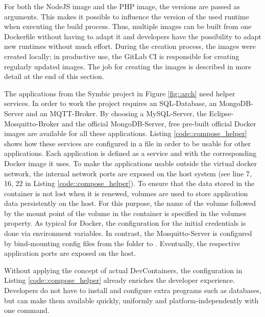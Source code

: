         
        For both the NodeJS image and the PHP image, the versions are passed as arguments. This makes it possible to influence the version of the used runtime when executing the build process. Thus, multiple images can be built from one Dockerfile without having to adapt it and developers have the possibility to adapt new runtimes without much effort. During the creation process, the images were created locally; in productive use, the GitLab \ac{CI} is responsible for creating regularly updated images. The job for creating the images is described in more detail at the end of this section.

        The applications from the Symbic project in Figure \ref{fig::arch} need helper services. In order to work the project requires an SQL-Database, an MongoDB-Server and an MQTT-Broker. By choosing a MySQL-Server, the Eclipse-Mosquitto-Broker and the official MongoDB-Server, free pre-built official Docker images are available for all these applications. Listing \ref{code::compose_helper} shows how these services are configured in a  file in order to be usable for other applications. Each application is defined as a service and with the corresponding Docker image it uses. To make the applications usable outside the virtual docker network, the internal network ports are exposed on the host system (see line 7, 16, 22 in Listing \ref{code::compose_helper}). To ensure that the data stored in the container is not lost when it is renewed, volumes are used to store application data persistently on the host. For this purpose, the name of the volume followed by the mount point of the volume in the container is specified in the volumes property. As typical for Docker, the configuration for the initial credentials is done via environment variables. In contrast, the Mosquitto-Server is configured by bind-mounting config files from the  folder to . Eventually, the respective application ports are exposed on the host.\newline
        
        Without applying the concept of actual DevContainers, the configuration in Listing \ref{code::compose_helper} already enriches the developer experience. Developers do not have to install and configure extra programs such as databases, but can make them available quickly, uniformly and platform-independently with one command.\newline
